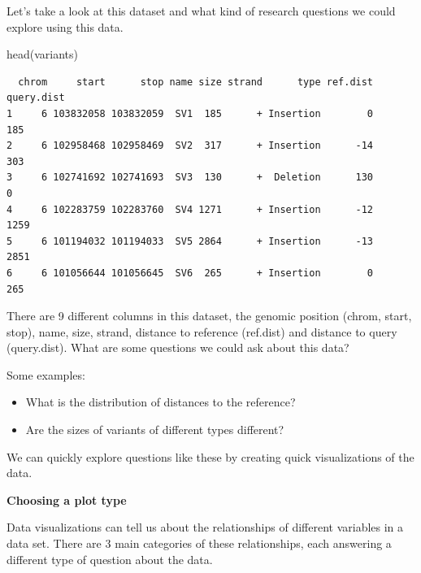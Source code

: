 \documentclass[
  letterpaper,
  DIV=11,
  numbers=noendperiod]{scrreprt}
\newenvironment{Shaded}{\begin{snugshade}}{\end{snugshade}}
\newcommand{\FunctionTok}[1]{\textcolor[rgb]{0.28,0.35,0.67}{#1}}
\newcommand{\NormalTok}[1]{\textcolor[rgb]{0.00,0.23,0.31}{#1}}
\begin{document}
Let's take a look at this dataset and what kind of research questions we
could explore using this data.

\begin{Shaded}
\begin{Highlighting}[]
\FunctionTok{head}\NormalTok{(variants)}
\end{Highlighting}
\end{Shaded}

\begin{verbatim}
  chrom     start      stop name size strand      type ref.dist query.dist
1     6 103832058 103832059  SV1  185      + Insertion        0        185
2     6 102958468 102958469  SV2  317      + Insertion      -14        303
3     6 102741692 102741693  SV3  130      +  Deletion      130          0
4     6 102283759 102283760  SV4 1271      + Insertion      -12       1259
5     6 101194032 101194033  SV5 2864      + Insertion      -13       2851
6     6 101056644 101056645  SV6  265      + Insertion        0        265
\end{verbatim}

There are 9 different columns in this dataset, the genomic position
(chrom, start, stop), name, size, strand, distance to reference
(ref.dist) and distance to query (query.dist). What are some questions
we could ask about this data?

Some examples:

\begin{itemize}
\item
  What is the distribution of distances to the reference?
\item
  Are the sizes of variants of different types different?
\end{itemize}

We can quickly explore questions like these by creating quick
visualizations of the data.

\textbf{Choosing a plot type}

Data visualizations can tell us about the relationships of different
variables in a data set. There are 3 main categories of these
relationships, each answering a different type of question about the
data.
\end{document}
